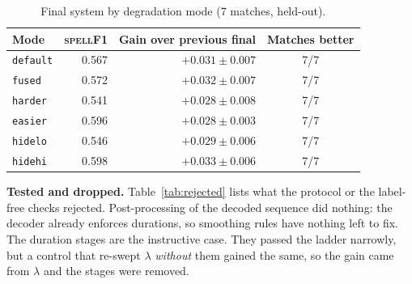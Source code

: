 \documentclass[journal]{IEEEtran}
\newcommand{\spf}{\textsc{spellF1}}
\begin{document}
\begin{table}[t]
\caption{Final system by degradation mode (7 matches, held-out).}
\label{tab:final}
\centering
\footnotesize
\begin{tabular}{@{}lrrc@{}}
\toprule
Mode & \spf{} & Gain over previous final & Matches better\\
\midrule
\texttt{default} & 0.567 & $+0.031\pm0.007$ & 7/7\\
\texttt{fused}   & 0.572 & $+0.032\pm0.007$ & 7/7\\
\texttt{harder}  & 0.541 & $+0.028\pm0.008$ & 7/7\\
\texttt{easier}  & 0.596 & $+0.028\pm0.003$ & 7/7\\
\texttt{hidelo}  & 0.546 & $+0.029\pm0.006$ & 7/7\\
\texttt{hidehi}  & 0.598 & $+0.033\pm0.006$ & 7/7\\
\bottomrule
\end{tabular}
\end{table}

\textbf{Tested and dropped.} Table~\ref{tab:rejected} lists what the protocol or the label-free checks rejected. Post-processing of the decoded sequence did nothing: the decoder already enforces durations, so smoothing rules have nothing left to fix. The duration stages are the instructive case. They passed the ladder narrowly, but a control that re-swept $\lambda$ \emph{without} them gained the same, so the gain came from $\lambda$ and the stages were removed.
\end{document}
